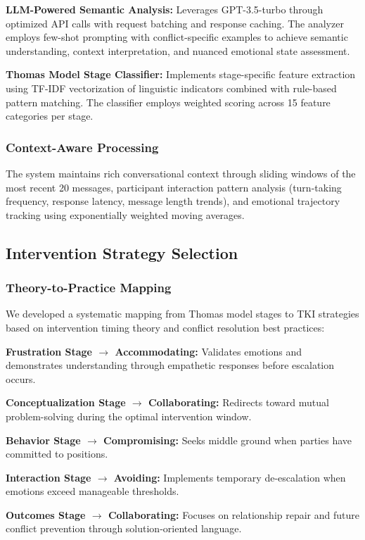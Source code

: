 \documentclass[12pt,a4paper]{article}
\begin{document}
\textbf{LLM-Powered Semantic Analysis:} Leverages GPT-3.5-turbo through optimized API calls with request batching and response caching. The analyzer employs few-shot prompting with conflict-specific examples to achieve semantic understanding, context interpretation, and nuanced emotional state assessment.

\textbf{Thomas Model Stage Classifier:} Implements stage-specific feature extraction using TF-IDF vectorization of linguistic indicators combined with rule-based pattern matching. The classifier employs weighted scoring across 15 feature categories per stage.

\subsubsection{Context-Aware Processing}
The system maintains rich conversational context through sliding windows of the most recent 20 messages, participant interaction pattern analysis (turn-taking frequency, response latency, message length trends), and emotional trajectory tracking using exponentially weighted moving averages.

\subsection{Intervention Strategy Selection}

\subsubsection{Theory-to-Practice Mapping}
We developed a systematic mapping from Thomas model stages to TKI strategies based on intervention timing theory and conflict resolution best practices:

\textbf{Frustration Stage $\rightarrow$ Accommodating:} Validates emotions and demonstrates understanding through empathetic responses before escalation occurs.

\textbf{Conceptualization Stage $\rightarrow$ Collaborating:} Redirects toward mutual problem-solving during the optimal intervention window.

\textbf{Behavior Stage $\rightarrow$ Compromising:} Seeks middle ground when parties have committed to positions.

\textbf{Interaction Stage $\rightarrow$ Avoiding:} Implements temporary de-escalation when emotions exceed manageable thresholds.

\textbf{Outcomes Stage $\rightarrow$ Collaborating:} Focuses on relationship repair and future conflict prevention through solution-oriented language.
\end{document}
